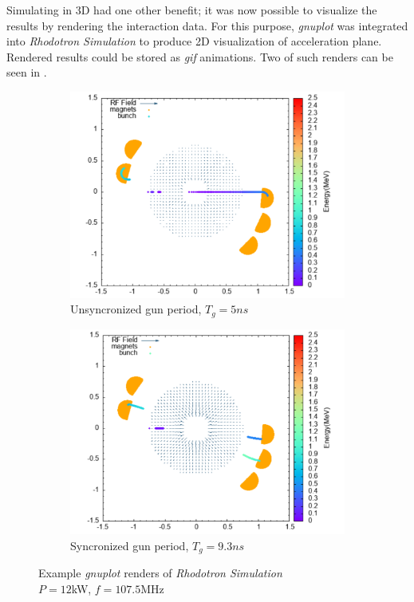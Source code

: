 \documentclass{book}
\begin{document}
Simulating in 3D had one other benefit; it was now possible to visualize the results by rendering the interaction data. 
For this purpose, \textit{gnuplot} was integrated into \textit{Rhodotron Simulation} to produce 2D visualization of acceleration plane. 
Rendered results could be stored as \textit{gif} animations. 
Two of such renders can be seen in .
\begin{figure}[H]
    \captionsetup[subfigure]{justification=centering}
    \captionsetup{justification=centering}
    \centering
    \begin{subfigure}{0.9\textwidth}
        \centering
        \includegraphics[width=\linewidth]{../../../figures/rhodoSim/5ns_gnuplot.png}
        \caption*{Unsyncronized \e gun period, $T_g = 5ns$}
    \end{subfigure}
    \begin{subfigure}{0.9\textwidth}
        \centering
        \includegraphics[width=\linewidth]{../../../figures/rhodoSim/9_3ns_gnuplot.png}
        \caption*{Syncronized \e gun period, $T_g = 9.3ns$}
    \end{subfigure}
    \caption{Example \textit{gnuplot} renders of \textit{Rhodotron Simulation}\\$P=12$kW, $f=107.5$MHz}
    \label{fig:example_gnuplot_renders}
\end{figure}
\end{document}
